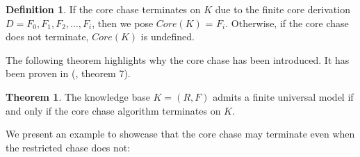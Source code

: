 \documentclass{article}
\theoremstyle{definition}
\newtheorem{definition}{Definition}[section]
\newtheorem{theorem}{Theorem}[section]
\theoremstyle{remark}
\begin{document}
\begin{definition}
If the core chase terminates on $K$ due to the finite core derivation $D=F_0,F_1,F_2,\ldots,F_i$, then we pose \emph{$\textit{Core}(K)$} = $F_i$. Otherwise, if the core chase does not terminate, $\textit{Core}(K)$ is undefined.
\end{definition}

The following theorem highlights why the core chase has been introduced. It has been proven in (\cite{core_chase}, theorem 7).

\begin{theorem}
The knowledge base $K = (R,F)$ admits a finite universal model if and only if the core chase algorithm terminates on $K$.
\end{theorem}

We present an example to showcase that the core chase may terminate even when the restricted chase does not:
\end{document}
